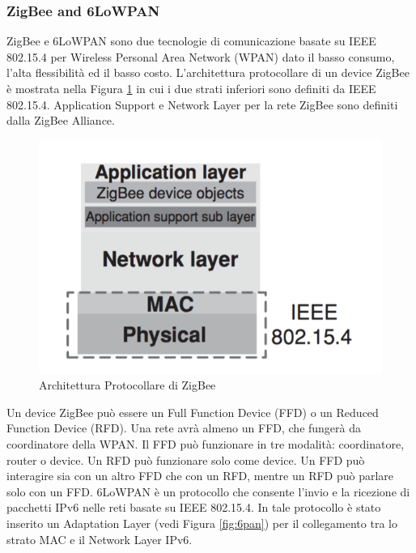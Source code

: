 \subsubsection{ZigBee and 6LoWPAN}
ZigBee e 6LoWPAN sono due tecnologie di comunicazione basate su IEEE 802.15.4 per Wireless Personal Area Network (WPAN) dato il basso consumo, l'alta flessibilità ed il basso costo. L'architettura protocollare di un device ZigBee è mostrata nella Figura \ref{fig:zbprot} in cui i due strati inferiori sono definiti da IEEE 802.15.4. Application Support e Network Layer per la rete ZigBee sono definiti dalla ZigBee Alliance.
\begin{figure}[h]
	\centering
	\includegraphics[scale=0.350]{imgs/zbprot.png}
	\caption{Architettura Protocollare di ZigBee} \label{fig:zbprot}
\end{figure}
Un device ZigBee può essere un Full Function Device (FFD) o un Reduced Function Device (RFD). Una rete avrà almeno un FFD, che fungerà da coordinatore della WPAN. Il FFD può funzionare in tre modalità: coordinatore, router o device. Un RFD può funzionare solo come device. Un FFD può interagire sia con un altro FFD che con un RFD, mentre un RFD può parlare solo con un FFD.
\newline\newline
6LoWPAN è un protocollo che consente l'invio e la ricezione di pacchetti IPv6 nelle reti basate su IEEE 802.15.4. In tale protocollo è stato inserito un Adaptation Layer (vedi Figura \ref{fig:6pan}) per il collegamento tra lo strato MAC e il Network Layer IPv6.
